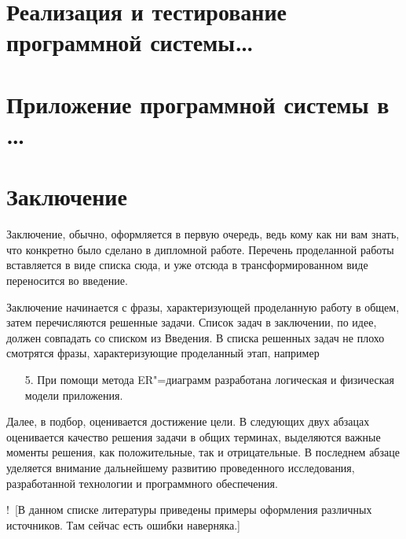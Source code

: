 \documentclass[a4paper,14pt, openany, twoside, draft]{extbook} %
\newcommand{\nnn}[2][ncolor]{\noindent%
\textcolor{eclr}{!\ [}\textcolor{#1}{#2}\textcolor{eclr}{]}}
\begin{document}
\chapter{Реализация и тестирование программной системы\ldots{}}

\chapter{Приложение программной системы в \ldots{}}

\chapter*{Заключение}

Заключение, обычно, оформляется в первую очередь, ведь кому как ни вам знать, что конкретно было сделано в дипломной работе.  Перечень проделанной работы вставляется в виде списка сюда, и уже отсюда в трансформированном виде переносится во введение.

Заключение начинается с фразы, характеризующей проделанную работу в общем, затем перечисляются решенные задачи.  Список задач в заключении, по идее, должен совпадать со списком из Введения.  В списка решенных задач не плохо смотрятся фразы, характеризующие проделанный этап, например
\begin{itemize}
\item[5.] При помощи метода ER"=диаграмм разработана логическая и физическая модели приложения.
\end{itemize}

Далее, в подбор, оценивается достижение цели.  В следующих двух абзацах оценивается качество решения задачи в общих терминах, выделяются важные моменты решения, как положительные, так и отрицательные.  В последнем абзаце уделяется внимание дальнейшему развитию проведенного исследования, разработанной технологии и программного обеспечения.


\nnn{В данном списке литературы приведены примеры оформления различных источников.  Там сейчас есть ошибки наверняка.}
\end{document}
